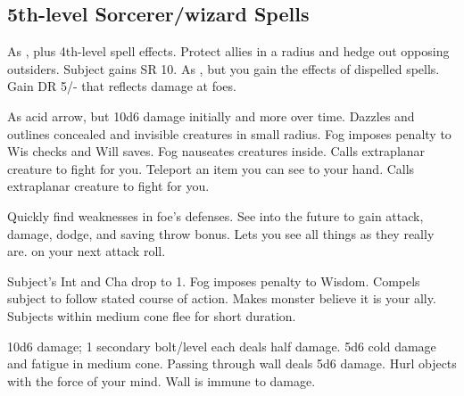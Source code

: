 \subsection{5th-level Sorcerer/wizard Spells} 
\begin{swspelllist}
   As , plus 4th-level spell effects.
   Protect allies in a \areamed radius and hedge out opposing outsiders.
   Subject gains SR 10.
   As , but you gain the effects of dispelled spells.
   Gain DR 5/- that reflects damage at foes.

   As acid arrow, but 10d6 damage initially and more over time.
   Dazzles and outlines concealed and invisible creatures in small radius.
   Fog imposes  penalty to Wis checks and Will saves.
   Fog nauseates creatures inside.
   Calls extraplanar creature to fight for you.
   Teleport an item you can see to your hand.
   Calls extraplanar creature to fight for you.

   Quickly find weaknesses in foe's defenses.
   See into the future to gain attack, damage, dodge, and saving throw bonus.
  \M Lets you see all things as they really are.
    on your next attack roll.

   Subject's Int and Cha drop to 1.
   Fog imposes  penalty to Wisdom.
   Compels subject to follow stated course of action.
   Makes monster believe it is your ally.
   Subjects within medium cone flee for short duration.

   10d6 damage; 1 secondary bolt/level each deals half damage.
   5d6 cold damage and fatigue in medium cone.
   Passing through wall deals 5d6 damage.
   Hurl objects with the force of your mind.
   Wall is immune to damage.


\end{swspelllist}
